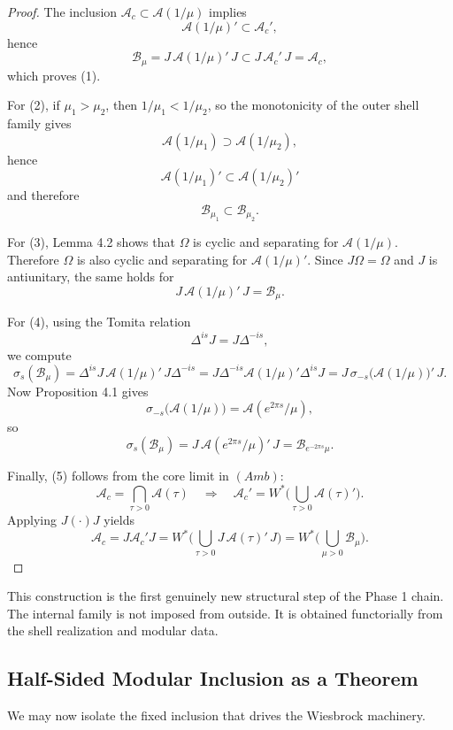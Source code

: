 \documentclass[12pt]{article}
\theoremstyle{definition}
\theoremstyle{remark}
\begin{document}
\begin{proof}
The inclusion \(\mathcal{A}_c\subset \mathcal{A}(1/\mu)\) implies \[
\mathcal{A}(1/\mu)'\subset \mathcal{A}_c',
\] hence \[
\mathcal{B}_\mu
=
J\,\mathcal{A}(1/\mu)'\,J
\subset
J\,\mathcal{A}_c'\,J
=
\mathcal{A}_c,
\] which proves (1).

For (2), if \(\mu_1>\mu_2\), then \(1/\mu_1<1/\mu_2\), so the
monotonicity of the outer shell family gives \[
\mathcal{A}(1/\mu_1)\supset \mathcal{A}(1/\mu_2),
\] hence \[
\mathcal{A}(1/\mu_1)'\subset \mathcal{A}(1/\mu_2)'
\] and therefore \[
\mathcal{B}_{\mu_1}\subset \mathcal{B}_{\mu_2}.
\]

For (3), Lemma 4.2 shows that \(\Omega\) is cyclic and separating for
\(\mathcal{A}(1/\mu)\). Therefore \(\Omega\) is also cyclic and
separating for \(\mathcal{A}(1/\mu)'\). Since \(J\Omega=\Omega\) and
\(J\) is antiunitary, the same holds for \[
J\,\mathcal{A}(1/\mu)'\,J=\mathcal{B}_\mu.
\]

For (4), using the Tomita relation \[
\Delta^{is}J=J\Delta^{-is},
\] we compute \[
\sigma_s(\mathcal{B}_\mu)
=
\Delta^{is}J\,\mathcal{A}(1/\mu)'\,J\Delta^{-is}
=
J\Delta^{-is}\mathcal{A}(1/\mu)'\Delta^{is}J
=
J\,\sigma_{-s}\!\big(\mathcal{A}(1/\mu)\big)'\,J.
\] Now Proposition 4.1 gives \[
\sigma_{-s}\!\big(\mathcal{A}(1/\mu)\big)
=
\mathcal{A}(e^{2\pi s}/\mu),
\] so \[
\sigma_s(\mathcal{B}_\mu)
=
J\,\mathcal{A}(e^{2\pi s}/\mu)'\,J
=
\mathcal{B}_{e^{-2\pi s}\mu}.
\]

Finally, (5) follows from the core limit in \((Amb)\): \[
\mathcal{A}_c=\bigcap_{\tau>0}\mathcal{A}(\tau)
\quad\Longrightarrow\quad
\mathcal{A}_c'=W^*\!\Big(\bigcup_{\tau>0}\mathcal{A}(\tau)'\Big).
\] Applying \(J(\cdot)J\) yields \[
\mathcal{A}_c
=
J\mathcal{A}_c'J
=
W^*\!\Big(\bigcup_{\tau>0}J\,\mathcal{A}(\tau)'\,J\Big)
=
W^*\!\Big(\bigcup_{\mu>0}\mathcal{B}_\mu\Big).
\]
\end{proof}

This construction is the first genuinely new structural step of the
Phase 1 chain. The internal family is not imposed from outside. It is
obtained functorially from the shell realization and modular data.

\subsection{Half-Sided Modular Inclusion as a
Theorem}\label{half-sided-modular-inclusion-as-a-theorem}

We may now isolate the fixed inclusion that drives the Wiesbrock
machinery.
\end{document}
